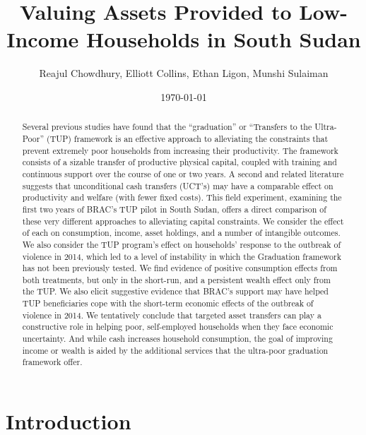 \documentclass[12pt,article]{article}
\author{Reajul Chowdhury, Elliott Collins, Ethan Ligon, Munshi Sulaiman}
\date{\today}
\title{Valuing Assets Provided to Low-Income Households in South Sudan}
\begin{document}
\maketitle
\begin{abstract}


Several previous studies have found that the ``graduation'' or ``Transfers to the
Ultra-Poor'' (TUP) framework is an effective approach to alleviating the constraints
that prevent extremely poor households from increasing their productivity. The
framework consists of a sizable transfer of productive physical capital, coupled with
training and continuous support over the course of one or two years. A second and
related literature suggests that unconditional cash transfers (UCT's) may have a
comparable effect on productivity and welfare (with fewer fixed costs). This field
experiment, examining the first two years of BRAC's TUP pilot in South Sudan, offers
a direct comparison of these very different approaches to alleviating capital
constraints. We consider the effect of each on consumption, income, asset holdings,
and a number of intangible outcomes. We also consider the TUP program's effect on
households' response to the outbreak of violence in 2014, which led to a level of
instability in which the Graduation framework has not been previously tested. We find
evidence of positive consumption effects from both treatments, but only in the
short-run, and a persistent wealth effect only from the TUP. We also elicit
suggestive evidence that BRAC's support may have helped TUP beneficiaries cope with
the short-term economic effects of the outbreak of violence in 2014. We tentatively
conclude that targeted asset transfers can play a constructive role in helping poor,
self-employed households when they face economic uncertainty. And while cash
increases household consumption, the goal of improving income or wealth is aided by
the additional services that the ultra-poor graduation framework offer.
\end{abstract}
\newpage

\section{Introduction}
\label{sec-1}
\end{document}
